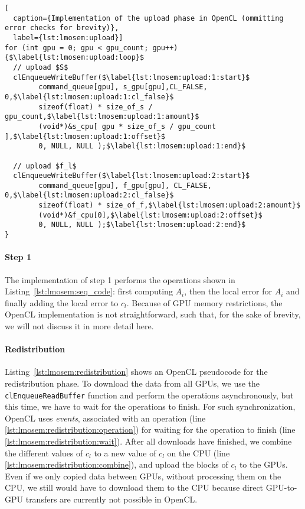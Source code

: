\begin{lstlisting}[
  caption={Implementation of the upload phase in OpenCL (ommitting error checks for brevity)},
  label={lst:lmosem:upload}]
for (int gpu = 0; gpu < gpu_count; gpu++) {$\label{lst:lmosem:upload:loop}$
  // upload $S$
  clEnqueueWriteBuffer($\label{lst:lmosem:upload:1:start}$
        command_queue[gpu], s_gpu[gpu],CL_FALSE, 0,$\label{lst:lmosem:upload:1:cl_false}$
        sizeof(float) * size_of_s / gpu_count,$\label{lst:lmosem:upload:1:amount}$
        (void*)&s_cpu[ gpu * size_of_s / gpu_count ],$\label{lst:lmosem:upload:1:offset}$
        0, NULL, NULL );$\label{lst:lmosem:upload:1:end}$

  // upload $f_l$
  clEnqueueWriteBuffer($\label{lst:lmosem:upload:2:start}$
        command_queue[gpu], f_gpu[gpu], CL_FALSE, 0,$\label{lst:lmosem:upload:2:cl_false}$
        sizeof(float) * size_of_f,$\label{lst:lmosem:upload:2:amount}$
        (void*)&f_cpu[0],$\label{lst:lmosem:upload:2:offset}$
        0, NULL, NULL );$\label{lst:lmosem:upload:2:end}$
}
\end{lstlisting}

\paragraph{Step 1}
The implementation of step 1 performs the operations shown in Listing~\ref{lst:lmosem:seq_code}: first computing $A_i$, then the local error for $A_i$ and finally adding the local error to $c_l$.
Because of GPU memory restrictions, the OpenCL implementation is not straightforward, such that, for the sake of brevity, we will not discuss it in more detail here.

\paragraph{Redistribution}
Listing~\ref{lst:lmosem:redistribution} shows an OpenCL pseudocode for the redistribution phase.
To download the data from all GPUs, we use the \texttt{clEnqueueReadBuffer} function and perform the operations asynchronously, but this time, we have to wait for the operations to finish.
For such synchronization, OpenCL uses \emph{events}, associated with an operation (line \ref{lst:lmosem:redistribution:operation}) for waiting for the operation to finish (line \ref{lst:lmosem:redistribution:wait}).
After all downloads have finished, we combine the different values of $c_l$ to a new value of $c_l$ on the CPU (line \ref{lst:lmosem:redistribution:combine}), and upload the blocks of $c_l$ to the GPUs.
Even if we only copied data between GPUs, without processing them on the CPU, we still would have to download them to the CPU because direct GPU-to-GPU transfers are currently not possible in OpenCL.

